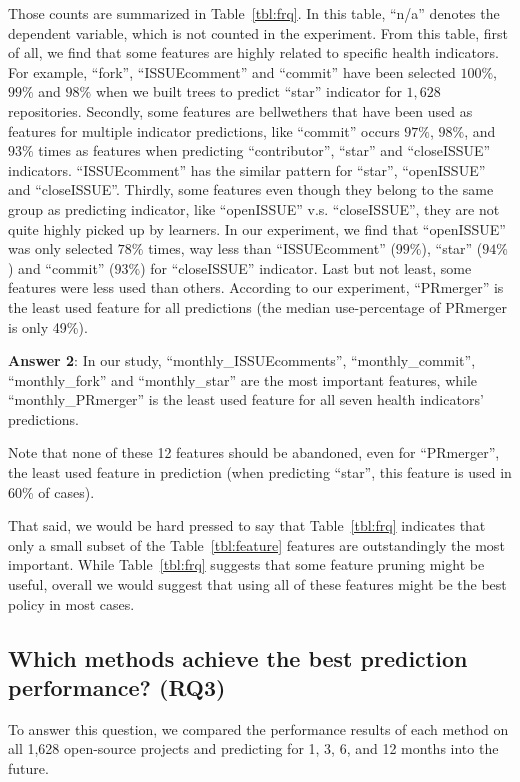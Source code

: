 \documentclass[sigconf,anonymous,review]{acmart}
\newcommand{\tbl}[1]{Table~\ref{tbl:#1}}
\begin{document}
Those counts are summarized in  Table~\ref{tbl:frq}. In this table, ``n/a''  denotes the dependent variable, which is not counted in the experiment. From this table, first of all, we find that some features are highly related to specific health indicators. For example, ``fork'', ``ISSUEcomment'' and  ``commit'' have been selected  $100\%$,  $99\%$ and  $98\%$  when we built trees to predict ``star'' indicator for $1,628$ repositories.  Secondly, some features are bellwethers that have been used as features for multiple indicator predictions, like ``commit'' occurs $97\%$, $98\%$, and $93\%$ times as features when predicting ``contributor'', ``star'' and ``closeISSUE'' indicators. ``ISSUEcomment'' has the similar pattern for ``star'', ``openISSUE'' and ``closeISSUE''. Thirdly, some features even though they belong to the same group as predicting indicator, like ``openISSUE'' v.s. ``closeISSUE'', they are not quite highly picked up by learners. In our experiment, we find that  ``openISSUE'' was only selected $78\%$ times, way less than ``ISSUEcomment'' ($99\%$), ``star'' ($94\%$) and ``commit'' ($93\%$) for ``closeISSUE'' indicator. Last but not least,  some features were less used than others. According to our experiment, ``PRmerger'' is the least used feature for all predictions (the median use-percentage of PRmerger is only 49\%).


\begin{blockquote}
\noindent
\textbf{Answer 2}: In our study, ``monthly\_ISSUEcomments'', ``monthly\_commit'', ``monthly\_fork'' and ``monthly\_star'' are the most important features, while ``monthly\_PRmerger'' is the least used feature for all seven health indicators' predictions.
\end{blockquote}

Note that none of these 12 features should be abandoned, even for ``PRmerger'', the least used feature in prediction (when predicting ``star'', this feature is used in 60\% of cases).

 That said, we would be hard pressed to say
 that Table~\ref{tbl:frq} indicates that only a small subset of the \tbl{feature} features are outstandingly the  most important. While Table~\ref{tbl:frq} suggests that some feature pruning might be useful, overall we would suggest that using all of these features might be the best policy in most cases.



\subsection{Which methods achieve the best prediction performance? (RQ3)}
To answer this question, 
we compared the performance results of each method on all 1,628 open-source projects and predicting for 1, 3, 6, and 12 months into the future.  
\end{document}
